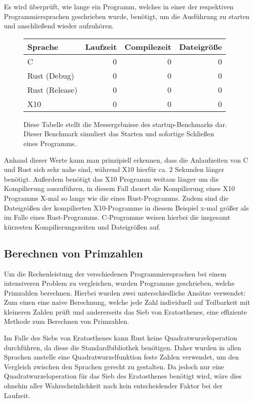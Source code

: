 Es wird überprüft, wie lange ein Programm, welches in einer der respektiven Programmiersprachen geschrieben wurde,
benötigt, um die Ausführung zu starten und anschließend wieder aufzuhören.

\begin{figure}[hb]
	\begin{center}
		\begin{tabular}{lrrr}
			\toprule
			Sprache & Laufzeit & Compilezeit & Dateigröße \\
			\midrule
			C & 0 & 0 & 0 \\
			Rust (Debug) & 0 & 0 & 0 \\
			Rust (Release) & 0 & 0 & 0 \\
			X10 & 0 & 0 & 0 \\
			\bottomrule
		\end{tabular}
	\end{center}
	\caption{
		Diese Tabelle stellt die Messergebnisse des startup-Benchmarks dar. Dieser Benchmark simuliert das Starten und sofortige
		Schließen eines Programms.
	}
	\label{fig:startup_table}
\end{figure}

Anhand dieser Werte kann man prinzipiell erkennen, dass die Anlaufzeiten von C und Rust sich sehr nahe sind, während X10
hierfür ca. 2 Sekunden länger benötigt.
Außerdem benötigt das X10 Programm weitaus länger um die Kompilierung auszuführen, in diesem Fall dauert die Kompilierung eines
X10 Programms X-mal so lange wie die eines Rust-Programms.
Zudem sind die Dateigrößen der kompilierten X10-Programme in diesem Beispiel x-mal größer als im Falle eines Rust-Programms.
C-Programme weisen hierbei die insgesamt kürzesten Kompilierungszeiten und Dateigrößen auf.

\subsection{Berechnen von Primzahlen}

Um die Rechenleistung der verschiedenen Programmiersprachen bei einem intensiveren Problem zu vergleichen, wurden
Programme geschrieben, welche Primzahlen berechnen. Hierbei wurden zwei unterschiedliche Ansätze verwendet: Zum einen
eine naive Berechnung, welche jede Zahl individuell auf Teilbarkeit mit kleineren Zahlen prüft und andererseits
das Sieb von Eratosthenes, eine effiziente Methode zum Berechnen von Primzahlen.

Im Falle des Siebs von Eratosthenes kann Rust keine Quadratwurzeloperation durchführen, da diese die Standardbibliothek
benötigen. Daher wurden in allen Sprachen anstelle eine Quadratwurzelfunktion feste Zahlen verwendet, um den Vergleich
zwischen den Sprachen gerecht zu gestalten. Da jedoch nur eine Quadratwurzeloperation für das Sieb des Eratosthenes
benötigt wird, wäre dies ohnehin aller Wahrscheinlichkeit nach kein entscheidender Faktor bei der Laufzeit.

